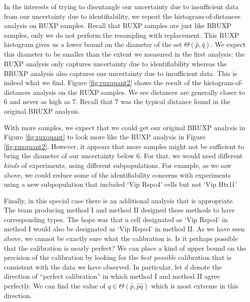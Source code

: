 In the interests of trying to disentangle our uncertainty due to insufficient data from our uncertainty due to identifiability, we repeat the histogram-of-distances analysis on RUXP samples.  Recall that RUXP samples are just like BRUXP samples, only we do not perform the resampling with replacement.  This RUXP histogram gives us a lower bound on the diameter of the set $\Theta(\hat p,\hat q)$.  We expect this diameter to be smaller than the extent we measured in the first analysis: the RUXP analysis only captures uncertainty due to identifiability whereas the BRUXP analysis also captures our uncertainty due to insufficient data.   This is indeed what we find.  Figure \ref{fig:ruxquant2} shows the result of the histogram-of-distances analysis on the RUXP samples.  We see distances are generally closer to 6 and never as high as 7.  Recall that 7 was the typical distance found in the original BRUXP analysis.  


With more samples, we expect that we could get our original BRUXP analysis in Figure \ref{fig:ruxquant} to look more like the RUXP analysis in Figure \ref{fig:ruxquant2}.  However, it appears that more samples might not be sufficient to bring the diameter of our uncertainty below 6.  For that, we would need different \emph{kinds} of experiments, using different subpopulations.  For example, as we saw above, we could reduce some of the identifiability concerns with experiments using a new subpopulation that included `Vip Rspo4' cells but not `Vip Htr1f.'

Finally, in this special case there is an additional analysis that is appropriate.  The team producing method I and method II designed these methods to have corresponding types.  The hope was that a cell designated as `Vip Rspo4' in method I would also be designated as `Vip Rspo4' in method II.  As we have seen above, we cannot be exactly sure what the calibration is.  Is it perhaps possible that the calibration is nearly perfect?  We can place a kind of upper bound on the precision of the calibration by looking for the \emph{best possible} calibration that is consistent with the data we have observed.  In particular, let $d$ denote the direction of ``perfect calibration'' in which method I and method II agree perfectly.  We can find the value of $q \in \Theta(\hat p,\hat p \hat q)$ which is most extreme in this direction.  

